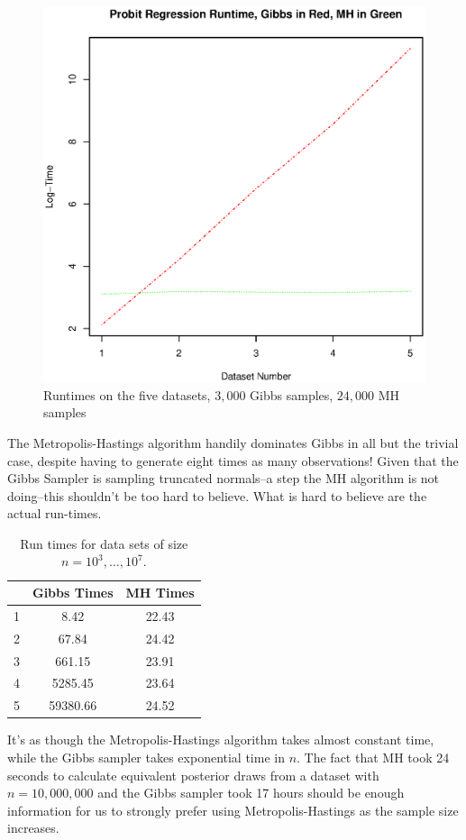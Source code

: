 \documentclass[12pt]{article}
\begin{document}
\begin{figure}[H] \center
\includegraphics[scale=.45]{Timings}
\caption{Runtimes on the five datasets, $3,000$ Gibbs samples, $24,000$ MH samples}
\end{figure}
The Metropolis-Hastings algorithm handily dominates Gibbs in all but the trivial case, despite having to generate eight times as many observations! Given that the Gibbs Sampler is sampling truncated normals--a step the MH algorithm is not doing--this shouldn't be too hard to believe. What is hard to believe are the actual run-times.

\begin{table}[H] \center
\begin{tabular}{ccc} \hline
& Gibbs Times & MH Times \\ \hline
1 & 8.42 & 22.43 \\ 
2 & 67.84 & 24.42 \\ 
3 & 661.15 & 23.91 \\ 
4 & 5285.45 & 23.64 \\ 
5 & 59380.66 & 24.52 \\ \hline
\end{tabular}
\caption{Run times for data sets of size $n = 10^3, \dots, 10^7$.}
\end{table}

It's as though the Metropolis-Hastings algorithm takes almost constant time, while the Gibbs sampler takes exponential time in $n$. The fact that MH took 24 seconds to calculate equivalent posterior draws from a dataset with $n=10,000,000$ and the Gibbs sampler took 17 hours should be enough information for us to strongly prefer using Metropolis-Hastings as the sample size increases.
\newpage
\end{document}
